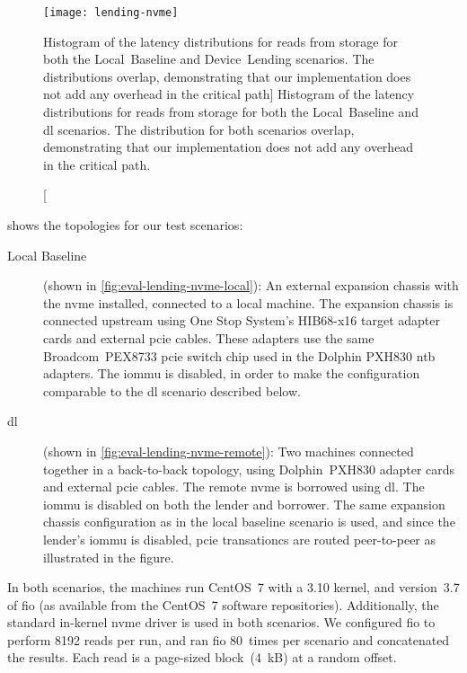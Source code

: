\begin{figure}
    \centering
    \texttt{[image: lending-nvme]}
    \caption
    [Histogram of the latency distributions for reads from storage for both the Local~Baseline and Device~Lending scenarios. The distributions overlap, demonstrating that our implementation does not add any overhead in the critical  path]
    {Histogram of the latency distributions for reads from storage for both the Local~Baseline and \gls{dl} scenarios. The distribution for both scenarios overlap, demonstrating that our implementation does not add any overhead in the critical  path.}
    \label{fig:eval-lending-nvme-results}
\end{figure}
%
 shows the topologies for our test scenarios:
\begin{description}
    \item[Local Baseline] (shown in \cref{fig:eval-lending-nvme-local}):%
        An external expansion chassis with the \gls{nvme} installed, connected to a local machine. 
        The expansion chassis is connected upstream using One Stop System's HIB68-x16 target adapter cards and external \gls{pcie} cables. 
        These adapters use the same Broadcom~PEX8733 \gls{pcie} switch chip used in the Dolphin PXH830 \gls{ntb} adapters.
        The \gls{iommu} is disabled, in order to make the configuration comparable to the \gls{dl} scenario described below.
        
    \item[\Gls{dl}] (shown in \cref{fig:eval-lending-nvme-remote}):
        Two machines connected together in a back-to-back topology, using Dolphin~PXH830 adapter cards and external \gls{pcie} cables.
        The remote \gls{nvme} is borrowed using \gls{dl}.
        The \gls{iommu} is disabled on both the \gls{lender} and \gls{borrower}.
        The same expansion chassis configuration as in the local baseline scenario is used, and since the \gls{lender}'s \gls{iommu} is disabled, \gls{pcie} transationcs are routed peer-to-peer as illustrated in the figure.
\end{description}



In both scenarios, the machines run CentOS~7 with a 3.10 kernel, and version~3.7 of \gls{fio} (as available from the CentOS~7 software repositories).
%
Additionally, the standard in-kernel \gls{nvme} driver is used in both scenarios.
%
We configured \gls{fio} to perform 8192 reads per run, and ran \gls{fio} 80~times per scenario and concatenated the results.
%
Each read is a page-sized block~(4~kB) at a random offset.



